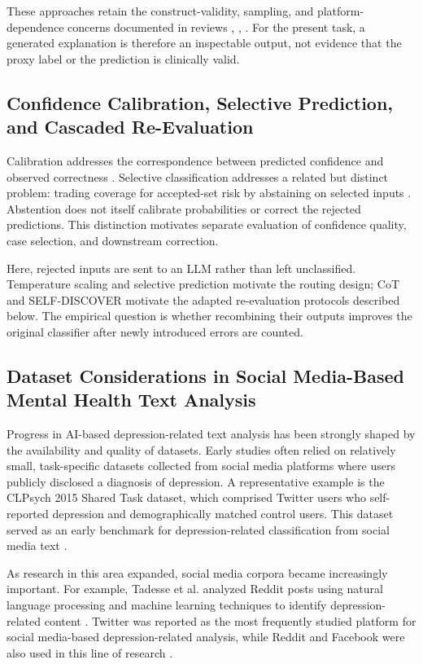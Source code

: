 \documentclass{ieeeaccess}
\begin{document}
These approaches retain the construct-validity, sampling, and platform-dependence concerns documented in reviews \cite{ref36}, \cite{ref37}, \cite{ref46}. For the present task, a generated explanation is therefore an inspectable output, not evidence that the proxy label or the prediction is clinically valid.

\subsection{Confidence Calibration, Selective Prediction, and Cascaded Re-Evaluation}

Calibration addresses the correspondence between predicted confidence and observed correctness \cite{ref15}. Selective classification addresses a related but distinct problem: trading coverage for accepted-set risk by abstaining on selected inputs \cite{ref16}. Abstention does not itself calibrate probabilities or correct the rejected predictions. This distinction motivates separate evaluation of confidence quality, case selection, and downstream correction.

Here, rejected inputs are sent to an LLM rather than left unclassified. Temperature scaling \cite{ref15} and selective prediction \cite{ref16} motivate the routing design; CoT \cite{ref17} and SELF-DISCOVER \cite{ref18} motivate the adapted re-evaluation protocols described below. The empirical question is whether recombining their outputs improves the original classifier after newly introduced errors are counted.

\subsection{Dataset Considerations in Social Media-Based Mental Health Text Analysis}

Progress in AI-based depression-related text analysis has been strongly shaped by the availability and quality of datasets. Early studies often relied on relatively small, task-specific datasets collected from social media platforms where users publicly disclosed a diagnosis of depression. A representative example is the CLPsych 2015 Shared Task dataset, which comprised Twitter users who self-reported depression and demographically matched control users. This dataset served as an early benchmark for depression-related classification from social media text \cite{ref23}.

As research in this area expanded, social media corpora became increasingly important. For example, Tadesse et al. analyzed Reddit posts using natural language processing and machine learning techniques to identify depression-related content \cite{ref31}. Twitter was reported as the most frequently studied platform for social media-based depression-related analysis, while Reddit and Facebook were also used in this line of research \cite{ref36}.
\end{document}

